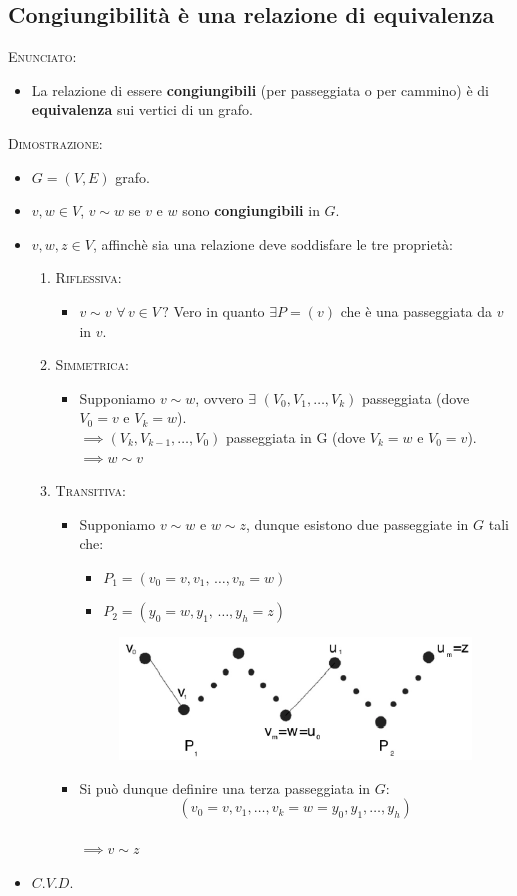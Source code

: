 \documentclass[10pt]{article}
\begin{document}
\subsection{Congiungibilità è una relazione di equivalenza}
\textsc{Enunciato:}
\begin{itemize}
\item
La relazione di essere \textbf{congiungibili} (per passeggiata o per cammino) è di \textbf{equivalenza} sui vertici di un grafo.
\end{itemize}
\textsc{Dimostrazione:}
\begin{itemize}
\item
$G = (V,E)$ grafo.
\item
$v,w \in V$, $v \sim w$ se $v$ e $w$ sono  \textbf{congiungibili} in $G$.
\item
$v,w,z \in V$, affinchè sia una relazione deve soddisfare le tre proprietà:
\begin{enumerate}
\item
\textsc{Riflessiva}:
\begin{itemize}
\item
$v \sim v \,\, \forall \, v \in V \, ?$ Vero in quanto $\exists P =(v)$ che è una passeggiata da $v$ in $v$.
\end{itemize}
\item
\textsc{Simmetrica}:
\begin{itemize}
\item
Supponiamo $v \sim w$, ovvero $\exists \,\, (V_0, V_1, \dotso, V_k)$ passeggiata (dove $V_0 = v$ e $V_k = w$).\\
$\implies (V_k, V_{k-1}, \dotso, V_0)$ passeggiata in G (dove $V_k = w$ e $V_0 = v$).\\
$\implies w \sim v$
\end{itemize}
\item
\textsc{Transitiva}:
\begin{itemize}
\item
Supponiamo $v \sim w$ e $w \sim z$, dunque esistono due passeggiate in $G$ tali che:
\begin{itemize}
\item
$P_1 = (v_0 = v, v_1, \,\dotso, v_n = w)$
\item
$P_2 = (y_0 = w, y_1, \,\dotso, y_h = z)$
\end{itemize}
\begin{center}
\begin{figure}[h]
\centering
\includegraphics[width = 0.5\linewidth]{CongiungibilitaRelazioneEquivalenza}
\end{figure}
\end{center}
\item
Si può dunque definire una terza passeggiata in $G$:
$$ (v_0 = v, v_1, \dotso, v_k = w = y_0, y_1, \dotso, y_h)$$
\\
$\implies v \sim z$
\end{itemize}
\end{enumerate}
\item
$C.V.D.$
\end{itemize}
\end{document}
